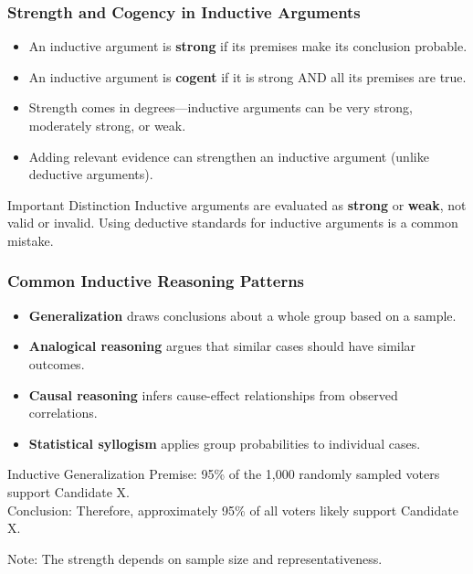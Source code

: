 \documentclass{beamer}
\begin{document}
\begin{frame}
    \frametitle{Strength and Cogency in Inductive Arguments}
    \begin{itemize}
        \item An inductive argument is \textbf{strong} if its premises make its conclusion probable.
        \item An inductive argument is \textbf{cogent} if it is strong AND all its premises are true.
        \item Strength comes in degrees—inductive arguments can be very strong, moderately strong, or weak.
        \item Adding relevant evidence can strengthen an inductive argument (unlike deductive arguments).
    \end{itemize}
    
    \begin{alertblock}{Important Distinction}
        Inductive arguments are evaluated as \textbf{strong} or \textbf{weak}, not valid or invalid. Using deductive standards for inductive arguments is a common mistake.
    \end{alertblock}
\end{frame}

\begin{frame}
    \frametitle{Common Inductive Reasoning Patterns}
    \begin{itemize}
        \item \textbf{Generalization} draws conclusions about a whole group based on a sample.
        \item \textbf{Analogical reasoning} argues that similar cases should have similar outcomes.
        \item \textbf{Causal reasoning} infers cause-effect relationships from observed correlations.
        \item \textbf{Statistical syllogism} applies group probabilities to individual cases.
    \end{itemize}
    
    \begin{exampleblock}{Inductive Generalization}
        Premise: 95\% of the 1,000 randomly sampled voters support Candidate X.\\
        Conclusion: Therefore, approximately 95\% of all voters likely support Candidate X.
        
        Note: The strength depends on sample size and representativeness.
    \end{exampleblock}
    
\end{frame}
\end{document}
